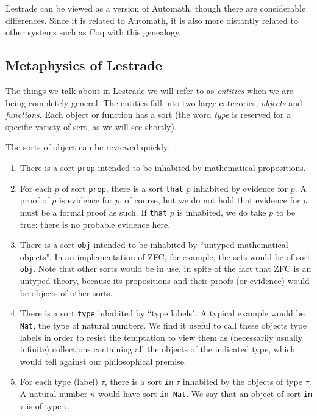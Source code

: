 \documentclass[12pt]{article}
\begin{document}
Lestrade can be viewed as a version of Automath, though there are considerable differences.  Since it is related to Automath, it is also more distantly related to other systems such as Coq with this genealogy.

\subsection{Metaphysics of Lestrade}

The things we talk about in Lestrade we will refer to as {\em entities} when we are being completely general.  The entities fall into two large categories, 
{\em objects\/} and {\em functions\/}.  Each object or function has a sort (the word {\em type\/} is reserved for a specific variety of sert, as we will see shortly).

The sorts of object can be reviewed quickly.

\begin{enumerate}

\item  There is a sort {\tt prop} intended to be inhabited by mathematical propositions.

\item  For each $p$ of sort {\tt prop}, there is a sort {\tt that} $p$ inhabited by evidence for $p$.  A proof of $p$ is evidence for $p$, of course, but we do not hold that evidence for $p$ must be a formal proof as such.  If {\tt that} $p$ is inhabited, we do take $p$ to be true:  there is no probable evidence here.

\item  There is a sort {\tt obj} intended to be inhabited by ``untyped mathematical objects".  In an implementation of ZFC, for example, the sets would be of sort {\tt obj}.  Note that other sorts would be in use, in spite of the fact that ZFC is an untyped theory, because its propositions and their proofs (or evidence) would be objects of other sorts.

\item  There is a sort {\tt type} inhabited by ``type labels".  A typical example would be {\tt Nat}, the type of natural numbers.  We find it useful to call these objects type labels in order to resist the temptation to view them as (necessarily usually infinite) collections containing all the objects of the indicated type, which would tell against our philosophical premise.

\item  For each type (label) $\tau$, there is a sort {\tt in} $\tau$ inhabited by the objects of type $\tau$.  A natural number $n$ would have sort
{\tt in Nat}.  We say that an object of sort {\tt in} $\tau$ is of type $\tau$.  

\end{enumerate}
\end{document}
